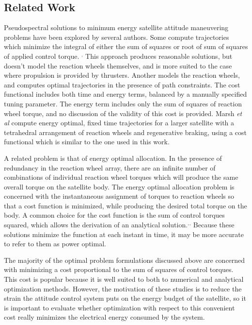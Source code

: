 \documentclass[letterpaper, paper,11pt]{AAS}
\begin{document}
\subsection{Related Work}
Pseudospectral solutions to minimum energy satellite attitude maneuvering  problems have been explored by several authors. Some compute trajectories which minimize the integral of either the sum of squares or root of sum of squares of applied control torque. \cite{Develle2011}$^,$\cite{Kedare2014} This approach produces reasonable solutions, but doesn't model the reaction wheels themselves, and is more suited to the case where propulsion is provided by thrusters. Another models the reaction wheels, and computes optimal trajectories in the presence of path constraints.\cite{Lee2014} The cost functional includes both time and energy terms, balanced by a manually specified tuning parameter. The energy term includes only the sum of squares of reaction wheel torque, and no discussion of the validity of this cost is provided. Marsh \textit{et al}\cite{Marsh2015} compute energy optimal, fixed time trajectories for a larger satellite with a tetrahedral arrangement of reaction wheels and regenerative braking, using a cost functional which is similar to the one used in this work.

A related problem is that of energy optimal allocation. In the presence of redundancy in the reaction wheel array, there are an infinite number of combinations of individual reaction wheel torques which will produce the same overall torque on the satellite body. The energy optimal allocation problem is concerned with the instantaneous assignment of torques to reaction wheels so that a cost function is minimized, while producing the desired total torque on the body. A common choice for the cost function is the sum of control torques squared, which allows the derivation of an analytical solution.\cite{Blenden2012}$^,$\cite{Wisniewski2005}$^,$\cite{Schaub2008} Because these solutions minimize the function at each instant in time, it may be more accurate to refer to them as power optimal.


The majority of the optimal problem formulations discussed above are concerned with minimizing a cost proportional to the sum of squares of control torques. This cost is popular because it is well suited to both to numerical and analytical optimization methods. However, the motivation of these studies is to reduce the strain the attitude control system puts on the energy budget of the satellite, so it is important to evaluate whether optimization with respect to this convenient cost really minimizes the electrical energy consumed by the system.
\end{document}
